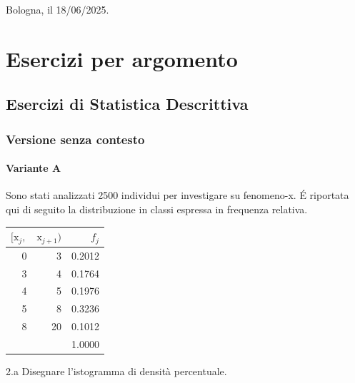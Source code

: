\documentclass[
  11pt,
]{book}
\theoremstyle{mytheoremstyle}
\theoremstyle{mydefstyle}
\begin{document}
Bologna, il 18/06/2025.

\part{Esercizi per argomento}

\chapter{Esercizi di Statistica Descrittiva}\label{esercizi-di-statistica-descrittiva}

\section{Versione senza contesto}\label{versione-senza-contesto}

\subsection{Variante A}\label{variante-a}

Sono stati analizzati 2500 individui per investigare su fenomeno-x. É riportata qui di seguito la distribuzione in classi espressa in frequenza relativa.

\begin{tabular}{rrr}
\toprule
$[\text{x}_j,$ & $\text{x}_{j+1})$ & $f_j$\\
\midrule
0 & 3 & 0.2012\\
3 & 4 & 0.1764\\
4 & 5 & 0.1976\\
5 & 8 & 0.3236\\
8 & 20 & 0.1012\\
 &  & 1.0000\\
\bottomrule
\end{tabular}

2.a Disegnare l'istogramma di densità percentuale.
\end{document}
